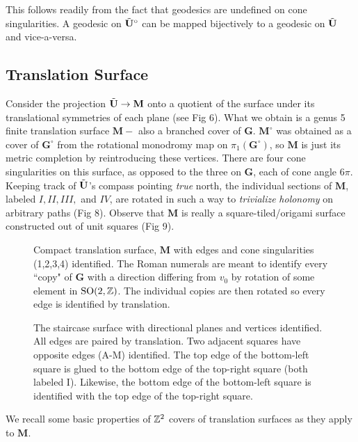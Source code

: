 \documentclass[]{article}
\def\bG{\mathbf{G}} \def\bGs{\mathbf{G}^\circ}
\def\bM{\mathbf{M}}
\def\bMs{\mathbf{M}^\circ}
\def\btUs{\btU^\circ}
\def\SO{\mathrm{SO}}
\begin{document}
This follows readily from the fact that geodesics are undefined on cone singularities. A geodesic on $\btUs$ can be mapped bijectively to a geodesic on  $\tilde{\mathbf{U}}$ and vice-a-versa.



\subsection{Translation Surface}
Consider the projection $\tilde{\mathbf{U}}\rightarrow\mathbf{M}$ onto a quotient of the surface under its translational symmetries of each plane (see Fig 6). What we obtain is a genus 5 finite translation surface $\bM-$ also a branched cover of $\bG$. $\bMs$ was obtained as a cover of $\bGs$ from the rotational monodromy map on $\pi_1(\bGs)$, so $\bM$ is just its metric completion by reintroducing these vertices. There are four cone singularities on this surface, as opposed to the three on $\bG$, each of cone angle $6\pi$. Keeping track of $\tilde{\mathbf{U}}$'s compass pointing \emph{true} north, the individual sections of $\bM$, labeled $I,II,III,$ and $IV$, are rotated in such a way to \emph{trivialize} \emph{holonomy} on arbitrary paths (Fig 8). Observe that $\bM$ is really a square-tiled/origami surface constructed out of unit squares (Fig 9).

\begin{figure}[H]
\centering

\caption{Compact translation surface, $\mathbf{M}$ with edges and cone singularities (1,2,3,4) identified. The Roman numerals are meant to identify every ``copy" of $\bG$ with a direction differing from $v_0$ by rotation of some element in $\SO(2,\ZZ)$. The individual copies are then rotated so every edge is identified by translation.}
\label{fig:mtilda}
\end{figure}

\begin{figure}[H]
\centering

\caption{The staircase surface with directional planes and vertices identified. All edges are paired by translation. Two adjacent squares have opposite edges (A-M) identified. The top edge of the bottom-left square is glued to the bottom edge of the top-right square (both labeled I). Likewise, the bottom edge of the bottom-left square is identified with the top edge of the top-right square.}
\label{fig:staircase}
\end{figure}

\noindent We recall some basic properties of $\mathbb{Z}^2$ covers of translation surfaces as they apply to $\bM$. 
\end{document}
